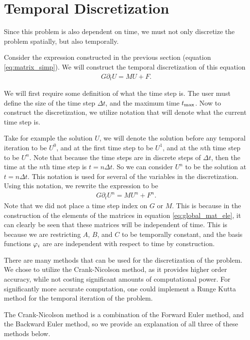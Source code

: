 \documentclass[../fem.tex]{subfile}
\begin{document}
\section{Temporal Discretization}%
\label{sec:temporal_discretization}

Since this problem is also dependent on time, we must not only discretize the
problem spatially, but also temporally.

Consider the expression constructed in the previous section (equation
\ref{eq:matrix_simp}). We will construct the temporal discretization of this
equation
\begin{align*}
   G\partial_t U=MU+F.
\end{align*}

We will first require some definition of what the time step is. The user must
define the size of the time step $\Delta t$, and the maximum time $t_{\text{max}}$. Now to
construct the discretization, we utilize notation that will denote what the
current time step is.

Take for example the solution $U$, we will denote the solution before any
temporal iteration to be $U^0$, and at the first time step to be $U^1$, and at
the $n$th time step to be $U^n$. Note that because the time steps are in
discrete steps of $\Delta t$, then the time at the $n$th time step is
$t=n\Delta t$. So we can consider $U^n$ to be the solution at $t=n\Delta t$.
This notation is used for several of the variables in the discretization. Using
this notation, we rewrite the expression to be
\begin{align}\label{eq:time_disc}
   G\partial_t U^n=MU^n+F^n.
\end{align}
Note that we did not place a time step index on $G$ or $M$. This is because in
the construction of the elements of the matrices in equation
\ref{eq:global_mat_ele}, it can clearly be seen that these matrices will be
independent of time. This is because we are restricting $A$, $B$, and $C$ to be
temporally constant, and the basis functions $\varphi_i$ are are independent with
respect to time by construction.

There are many methods that can be used for the discretization of the problem.
We chose to utilize the Crank-Nicolson method, as it provides higher order
accuracy, while not costing significant amounts of computational power. For
significantly more accurate computation, one could implement a Runge Kutta
method for the temporal iteration of the problem.

The Crank-Nicolson method is a combination of the Forward Euler method, and the
Backward Euler method, so we provide an explanation of all three of these
methods below.
\end{document}
